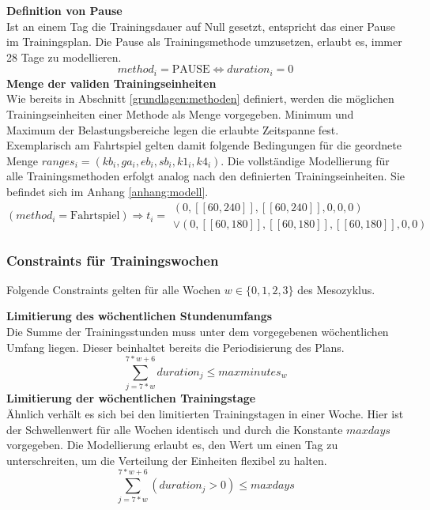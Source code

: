 \textbf{Definition von Pause} \\[0.2em]
Ist an einem Tag die Trainingsdauer auf Null gesetzt, entspricht das einer Pause im Trainingsplan. Die Pause als Trainingsmethode umzusetzen, erlaubt es, immer 28 Tage zu modellieren.
\begin{equation}
    method_i = \text{PAUSE} \Leftrightarrow duration_i = 0
\end{equation}
\textbf{Menge der validen Trainingseinheiten} \\[0.2em]
Wie bereits in Abschnitt \ref{grundlagen:methoden} definiert, werden die möglichen Trainingseinheiten einer Methode als Menge vorgegeben. Minimum und Maximum der Belastungsbereiche legen die erlaubte Zeitspanne fest. Exemplarisch am Fahrtspiel gelten damit folgende Bedingungen für die geordnete Menge $ranges_i = (kb_i, ga_i, eb_i, sb_i, k1_i, k4_i)$. Die vollständige Modellierung für alle Trainingsmethoden erfolgt analog nach den definierten Trainingseinheiten. Sie befindet sich im Anhang \ref{anhang:modell}.
\begin{equation}
    (method_i = \text{Fahrtspiel})\Rightarrow t_i = \begin{array}{c}
            (0, [\![60, 240]\!], [\![60, 240]\!], 0, 0, 0) \\ 
        \vee (0, [\![60,180]\!], [\![60, 180]\!], [\![60, 180]\!], 0, 0)
    \end{array}
\end{equation}
\subsubsection{Constraints für Trainingswochen}
Folgende Constraints gelten für alle Wochen $w \in \{0, 1, 2, 3\}$ des Mesozyklus.\par
\textbf{Limitierung des wöchentlichen Stundenumfangs} \\[0.2em]
Die Summe der Trainingsstunden muss unter dem vorgegebenen wöchentlichen Umfang liegen. Dieser beinhaltet bereits die Periodisierung des Plans.
\begin{equation}
    \sum_{j=7*w}^{7*w+6} duration_j \leq maxminutes_w
\end{equation}
\textbf{Limitierung der wöchentlichen Trainingstage} \\[0.2em]
Ähnlich verhält es sich bei den limitierten Trainingstagen in einer Woche. Hier ist der Schwellenwert für alle Wochen identisch und durch die Konstante $maxdays$ vorgegeben. Die Modellierung erlaubt es, den Wert um einen Tag zu unterschreiten, um die Verteilung der Einheiten flexibel zu halten. 
\begin{equation}
    \sum_{j=7*w}^{7*w+6}  (duration_j > 0) \leq maxdays
\end{equation}
